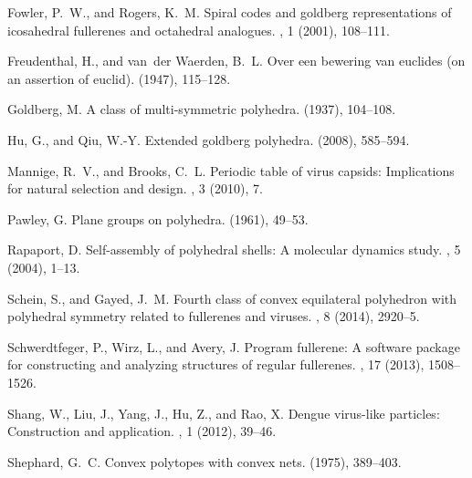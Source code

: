\documentclass[11pt]{article}
\newcommand{\1}{\mathds{1}}
\begin{document}
\begin{thebibliography}{10}
{\sc Fowler, P.~W., and Rogers, K.~M.}
\newblock Spiral codes and goldberg representations of icosahedral fullerenes
  and octahedral analogues.
, 1
  (2001), 108--111.

{\sc Freudenthal, H., and van~der Waerden, B.~L.}
\newblock Over een bewering van euclides (on an assertion of euclid).
 (1947), 115–128.

{\sc Goldberg, M.}
\newblock A class of multi-symmetric polyhedra.
 (1937), 104--108.

{\sc Hu, G., and Qiu, W.-Y.}
\newblock Extended goldberg polyhedra.
  (2008), 585--594.

{\sc Mannige, R.~V., and Brooks, C.~L.}
\newblock Periodic table of virus capsids: Implications for natural selection
  and design.
, 3 (2010), 7.

{\sc Pawley, G.}
\newblock Plane groups on polyhedra.
 (1961), 49--53.

{\sc Rapaport, D.}
\newblock Self-assembly of polyhedral shells: A molecular dynamics study.
, 5 (2004), 1--13.

{\sc Schein, S., and Gayed, J.~M.}
\newblock Fourth class of convex equilateral polyhedron with polyhedral
  symmetry related to fullerenes and viruses.
, 8 (2014), 2920--5.

{\sc Schwerdtfeger, P., Wirz, L., and Avery, J.}
\newblock Program fullerene: A software package for constructing and analyzing
  structures of regular fullerenes.
, 17 (2013), 1508--1526.

{\sc Shang, W., Liu, J., Yang, J., Hu, Z., and Rao, X.}
\newblock Dengue virus-like particles: Construction and application.
, 1 (2012), 39--46.

{\sc Shephard, G.~C.}
\newblock Convex polytopes with convex nets.
 (1975), 389--403.


\end{thebibliography}
\end{document}

